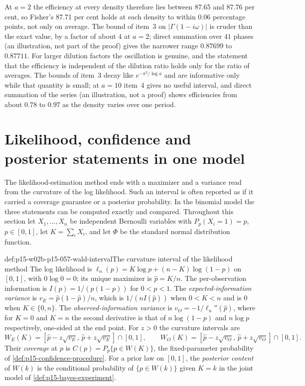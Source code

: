 At \(a=2\) the efficiency at every density therefore lies between 87.65
and 87.76 per cent, so Fisher's 87.71 per cent \cite[p.~366]{Fisher1922Foundations}
holds at each density to within \(0.06\) percentage points, not only on
average. The bound of item~3 on \(|\Gamma(1-i\omega)|\) is cruder than the
exact value, by a factor of about \(4\) at \(a=2\); direct summation over
\(41\) phases (an illustration, not part of the proof) gives the narrower
range \(0.87699\) to \(0.87711\). For larger dilution factors the oscillation is genuine, and the
statement that the efficiency is independent of the dilution ratio holds
only for the ratio of averages. The bounds of item~3 decay like
\(e^{-\pi^2/\log a}\) and are informative only while that quantity is
small; at \(a=10\) item~4 gives no useful interval, and direct summation of
the series (an illustration, not a proof) shows efficiencies from about
\(0.78\) to \(0.97\) as the density varies over one period.

\section{Likelihood, confidence and posterior statements in one model}
\label{sec:p15-w02b-p15-057-three-statements}

The likelihood-estimation method ends with a maximizer and a variance
read from the curvature of the log likelihood. Such an interval is often
reported as if it carried a coverage guarantee or a posterior
probability. In the binomial model the three statements can be computed
exactly and compared. Throughout this section let \(X_1,\ldots,X_n\) be
independent Bernoulli variables with \(P_p(X_i=1)=p\), \(p\in[0,1]\), let
\(K=\sum_iX_i\), and let \(\Phi\) be the standard normal distribution
function.

\begin{hbdefinition}{def:p15-w02b-p15-057-wald-interval}{The curvature interval of the likelihood method}
The log likelihood is \(\ell_n(p)=K\log p+(n-K)\log(1-p)\) on \([0,1]\),
with \(0\log0=0\); its unique maximizer is \(\hat p=K/n\). The
per-observation information is \(I(p)=1/(p(1-p))\) for \(0<p<1\). The
\emph{expected-information variance} is \(v_E=\hat p(1-\hat p)/n\), which
is \(1/(nI(\hat p))\) when \(0<K<n\) and is \(0\) when \(K\in\{0,n\}\). The
\emph{observed-information variance} is \(v_O=-1/\ell_n''(\hat p)\), where
for \(K=0\) and \(K=n\) the second derivative is that of
\(n\log(1-p)\) and \(n\log p\) respectively, one-sided at the end point.
For \(z>0\) the curvature intervals are
\[
 W_E(K)=[\hat p-z\sqrt{v_E},\,\hat p+z\sqrt{v_E}]\cap[0,1],\qquad
 W_O(K)=[\hat p-z\sqrt{v_O},\,\hat p+z\sqrt{v_O}]\cap[0,1].
\]
Their \emph{coverage} at \(p\) is \(C(p)=P_p\{p\in W(K)\}\), the
fixed-parameter probability of \cref{def:p15-confidence-procedure}. For a
prior law on \([0,1]\), the \emph{posterior content} of \(W(k)\) is the
conditional probability of \(\{p\in W(k)\}\) given \(K=k\) in the joint
model of \cref{def:p15-bayes-experiment}.
\end{hbdefinition}

